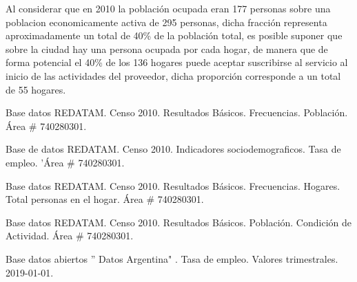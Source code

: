 Al considerar que en 2010 la población ocupada eran 177 personas \cite{censo2010-actividad} sobre una poblacion economicamente activa de 295 personas, dicha fracción representa aproximadamente un total de 40\% de la población total, es posible suponer que sobre la ciudad hay una persona ocupada por cada hogar, de manera que de forma potencial el 40\% de los 136 hogares puede aceptar suscribirse al servicio al inicio de las actividades del proveedor, dicha proporción corresponde a un total de 55 hogares. 






\newpage

\begin{thebibliography}{99}

 Base datos REDATAM. Censo 2010. Resultados Básicos. Frecuencias. Población. Área \# 740280301.

Base de datos REDATAM. Censo 2010. Indicadores sociodemograficos. Tasa de empleo. 'Área \# 740280301.

 Base datos REDATAM. Censo 2010. Resultados Básicos. Frecuencias. Hogares. Total personas en el hogar. Área \# 740280301.

 Base datos REDATAM. Censo 2010. Resultados Básicos. Población. Condición de Actividad. Área \# 740280301.

 Base datos abiertos '' Datos Argentina" . Tasa de empleo. Valores trimestrales. 2019-01-01.


\end{thebibliography}

\newpage